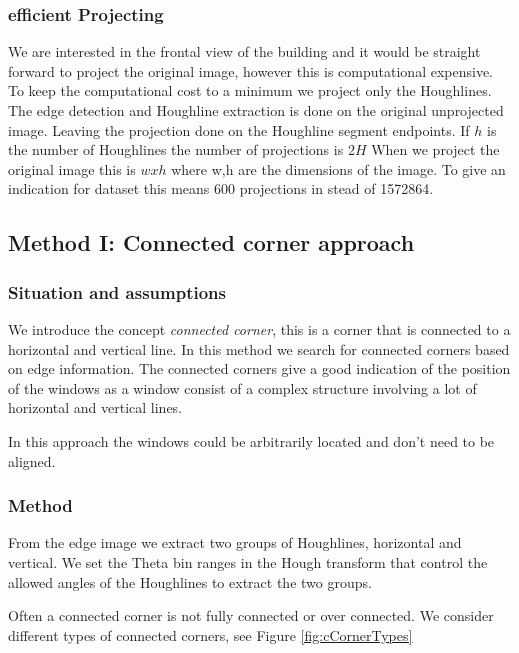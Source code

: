 \subsubsection{efficient Projecting} 
We are interested in the frontal view of the building and it would be straight
forward to project the original image, however this is computational
expensive. To keep the computational cost to a minimum we project only the
Houghlines. The edge detection and Houghline extraction is done on the original
unprojected image. Leaving the projection done on the Houghline segment
endpoints. If $h$ is the number of Houghlines the number of projections is $2H$
When we project the original image this is $wxh$ where w,h are the dimensions of
the image. To give an indication for dataset %
this means 600 projections in stead of 1572864.

\subsection{Method I: Connected corner approach} 
\subsubsection{Situation and assumptions}
We introduce the concept \emph{connected corner}, this is a corner that is 
connected to a horizontal and vertical line.  
In this method we search for connected corners based on edge information.
The connected corners give a good indication of the position of the windows as 
a window consist of a complex structure involving a lot of horizontal and vertical lines.

In this approach the windows could be arbitrarily located and don't need
to be aligned.

\subsubsection{Method}
From the edge image we extract two groups of Houghlines, horizontal and
vertical.  We set the Theta bin ranges in the Hough transform that control the
allowed angles of the Houghlines to extract the two groups.

Often a connected corner is not fully connected or over connected.
We consider different types of connected corners, see Figure \ref{fig:cCornerTypes} 

